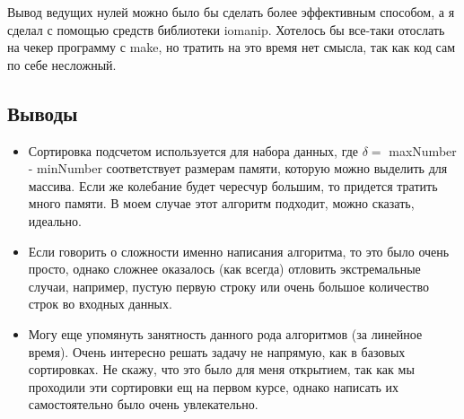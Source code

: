 \documentclass[12pt]{article}
\begin{document}
Вывод ведущих нулей можно было бы сделать более эффективным способом, а я сделал с помощью средств библиотеки iomanip. Хотелось бы все-таки отослать на чекер программу с make, но тратить на это время нет смысла, так как код сам по себе несложный.

\subsection*{Выводы}
\begin{itemize}
\item Сортировка подсчетом используется для набора данных, где $\delta =$ maxNumber - minNumber соответствует размерам памяти, которую можно выделить для массива. Если же колебание будет чересчур большим, то придется тратить много памяти. В моем случае этот алгоритм подходит, можно сказать, идеально.
\item Если говорить о сложности именно написания алгоритма, то это было очень просто, однако сложнее оказалось (как всегда) отловить экстремальные случаи, например, пустую первую строку или очень большое количество строк во входных данных.
\item Могу еще упомянуть занятность данного рода алгоритмов (за линейное время). Очень интересно решать задачу не напрямую, как в базовых сортировках. Не скажу, что это было для меня открытием, так как мы проходили эти сортировки ещ на первом курсе, однако написать их самостоятельно было очень увлекательно.
\end{itemize}
\end{document}
